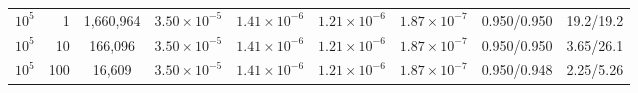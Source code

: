 \begin{table}[!tbp]
{{\begin{tabular}{rrccccccc}
\addlinespace
$10^{5}$ & 1 & 1{,}660{,}964 & $3.50\times10^{-5}$ & $1.41\times10^{-6}$ & $1.21\times10^{-6}$ & $1.87\times10^{-7}$ & 0.950/0.950 & 19.2/19.2\\
$10^{5}$ & 10 & 166{,}096 & $3.50\times10^{-5}$ & $1.41\times10^{-6}$ & $1.21\times10^{-6}$ & $1.87\times10^{-7}$ & 0.950/0.950 & 3.65/26.1\\
$10^{5}$ & 100 & 16{,}609 & $3.50\times10^{-5}$ & $1.41\times10^{-6}$ & $1.21\times10^{-6}$ & $1.87\times10^{-7}$ & 0.950/0.948 & 2.25/5.26\\
\end{tabular}
}}
\label{tab:metric-fixedB}
\end{table}
